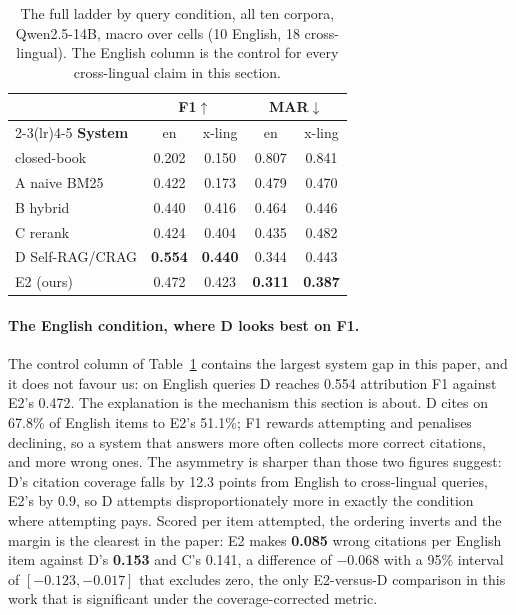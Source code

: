 \documentclass[11pt]{article}
\begin{document}
\begin{table}[t]
\centering\small
\begin{tabular}{@{}lcccc@{}}
\toprule
& \multicolumn{2}{c}{\textbf{F1}$\uparrow$} & \multicolumn{2}{c}{\textbf{MAR}$\downarrow$} \\
\cmidrule(lr){2-3}\cmidrule(lr){4-5}
\textbf{System} & en & x-ling & en & x-ling \\
\midrule
closed-book & 0.202 & 0.150 & 0.807 & 0.841 \\
A naive BM25 & 0.422 & 0.173 & 0.479 & 0.470 \\
B hybrid & 0.440 & 0.416 & 0.464 & 0.446 \\
C rerank & 0.424 & 0.404 & 0.435 & 0.482 \\
D Self-RAG/CRAG & \textbf{0.554} & \textbf{0.440} & 0.344 & 0.443 \\
E2 (ours) & 0.472 & 0.423 & \textbf{0.311} & \textbf{0.387} \\
\bottomrule
\end{tabular}
\caption{The full ladder by query condition, all ten corpora, Qwen2.5-14B, macro
over cells (10 English, 18 cross-lingual). The English column is the control for
every cross-lingual claim in this section.}
\label{tab:ladder}
\end{table}

\paragraph{The English condition, where D looks best on F1.} The control column
of Table~\ref{tab:ladder} contains the largest system gap in this paper, and it
does not favour us: on English queries D reaches 0.554 attribution F1 against
E2's 0.472. The explanation is the mechanism this section is about. D cites on 67.8\% of English items to
E2's 51.1\%; F1 rewards attempting and penalises declining, so a system that
answers more often collects more correct citations, and more wrong ones. The
asymmetry is sharper than those two figures suggest: D's citation coverage falls
by 12.3 points from English to cross-lingual queries, E2's by 0.9, so D attempts
disproportionately more in exactly the condition where attempting pays. Scored
per item attempted, the ordering inverts and the margin is the clearest in the
paper: E2 makes \textbf{0.085} wrong citations per English item against D's
\textbf{0.153} and C's 0.141, a difference of $-0.068$ with a 95\% interval of
$[-0.123,-0.017]$ that excludes zero, the only E2-versus-D comparison in this
work that is significant under the coverage-corrected metric.
\end{document}
